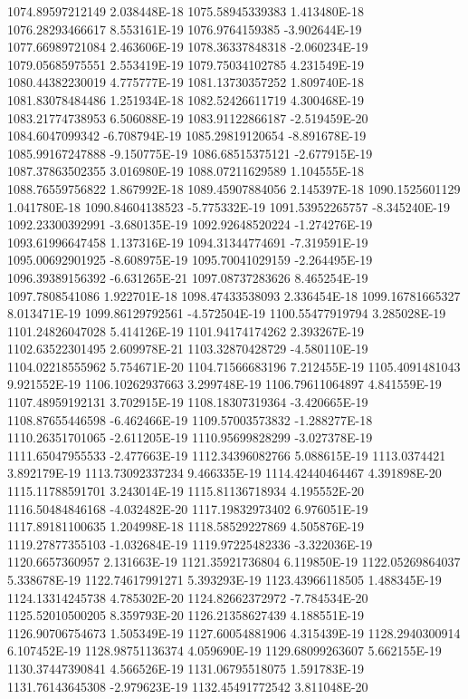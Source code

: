 1074.89597212149  2.038448E-18
1075.58945339383  1.413480E-18
1076.28293466617  8.553161E-19
1076.9764159385  -3.902644E-19
1077.66989721084  2.463606E-19
1078.36337848318  -2.060234E-19
1079.05685975551  2.553419E-19
1079.75034102785  4.231549E-19
1080.44382230019  4.775777E-19
1081.13730357252  1.809740E-18
1081.83078484486  1.251934E-18
1082.52426611719  4.300468E-19
1083.21774738953  6.506088E-19
1083.91122866187  -2.519459E-20
1084.6047099342  -6.708794E-19
1085.29819120654  -8.891678E-19
1085.99167247888  -9.150775E-19
1086.68515375121  -2.677915E-19
1087.37863502355  3.016980E-19
1088.07211629589  1.104555E-18
1088.76559756822  1.867992E-18
1089.45907884056  2.145397E-18
1090.1525601129  1.041780E-18
1090.84604138523  -5.775332E-19
1091.53952265757  -8.345240E-19
1092.23300392991  -3.680135E-19
1092.92648520224  -1.274276E-19
1093.61996647458  1.137316E-19
1094.31344774691  -7.319591E-19
1095.00692901925  -8.608975E-19
1095.70041029159  -2.264495E-19
1096.39389156392  -6.631265E-21
1097.08737283626  8.465254E-19
1097.7808541086  1.922701E-18
1098.47433538093  2.336454E-18
1099.16781665327  8.013471E-19
1099.86129792561  -4.572504E-19
1100.55477919794  3.285028E-19
1101.24826047028  5.414126E-19
1101.94174174262  2.393267E-19
1102.63522301495  2.609978E-21
1103.32870428729  -4.580110E-19
1104.02218555962  5.754671E-20
1104.71566683196  7.212455E-19
1105.4091481043  9.921552E-19
1106.10262937663  3.299748E-19
1106.79611064897  4.841559E-19
1107.48959192131  3.702915E-19
1108.18307319364  -3.420665E-19
1108.87655446598  -6.462466E-19
1109.57003573832  -1.288277E-18
1110.26351701065  -2.611205E-19
1110.95699828299  -3.027378E-19
1111.65047955533  -2.477663E-19
1112.34396082766  5.088615E-19
1113.0374421  3.892179E-19
1113.73092337234  9.466335E-19
1114.42440464467  4.391898E-20
1115.11788591701  3.243014E-19
1115.81136718934  4.195552E-20
1116.50484846168  -4.032482E-20
1117.19832973402  6.976051E-19
1117.89181100635  1.204998E-18
1118.58529227869  4.505876E-19
1119.27877355103  -1.032684E-19
1119.97225482336  -3.322036E-19
1120.6657360957  2.131663E-19
1121.35921736804  6.119850E-19
1122.05269864037  5.338678E-19
1122.74617991271  5.393293E-19
1123.43966118505  1.488345E-19
1124.13314245738  4.785302E-20
1124.82662372972  -7.784534E-20
1125.52010500205  8.359793E-20
1126.21358627439  4.188551E-19
1126.90706754673  1.505349E-19
1127.60054881906  4.315439E-19
1128.2940300914  6.107452E-19
1128.98751136374  4.059690E-19
1129.68099263607  5.662155E-19
1130.37447390841  4.566526E-19
1131.06795518075  1.591783E-19
1131.76143645308  -2.979623E-19
1132.45491772542  3.811048E-20
